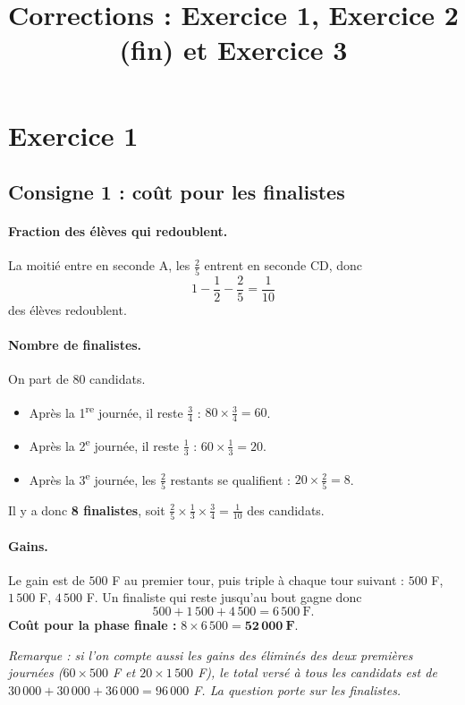 \documentclass[11pt,a4paper]{article}
\title{Corrections : Exercice 1, Exercice 2 (fin) et Exercice 3}
\date{}
\begin{document}
\maketitle

\section*{Exercice 1}

\subsection*{Consigne 1 : co\^ut pour les finalistes}

\paragraph{Fraction des \'el\`eves qui redoublent.}
La moiti\'e entre en seconde A, les $\frac25$ entrent en seconde CD, donc
\[
1-\frac12-\frac25=\frac{1}{10}
\]
des \'el\`eves redoublent.

\paragraph{Nombre de finalistes.} On part de $80$ candidats.
\begin{itemize}
  \item Apr\`es la 1\textsuperscript{re} journ\'ee, il reste $\frac34$ : $80\times\frac34=60$.
  \item Apr\`es la 2\textsuperscript{e} journ\'ee, il reste $\frac13$ : $60\times\frac13=20$.
  \item Apr\`es la 3\textsuperscript{e} journ\'ee, les $\frac25$ restants se qualifient : $20\times\frac25=8$.
\end{itemize}
Il y a donc \textbf{8 finalistes}, soit $\frac25\times\frac13\times\frac34=\frac1{10}$ des candidats.

\paragraph{Gains.} Le gain est de $500$ F au premier tour, puis triple \`a chaque tour suivant :
$500$ F, $1\,500$ F, $4\,500$ F. Un finaliste qui reste jusqu'au bout gagne donc
\[
500+1\,500+4\,500=6\,500\ \text{F}.
\]
\textbf{Co\^ut pour la phase finale :} $8\times6\,500=\mathbf{52\,000\ F}$.

\emph{Remarque : si l'on compte aussi les gains des \'elimin\'es des deux premi\`eres journ\'ees
($60\times500$ F et $20\times1\,500$ F), le total vers\'e \`a tous les candidats est de
$30\,000+30\,000+36\,000=96\,000$ F. La question porte sur les finalistes.}
\end{document}
